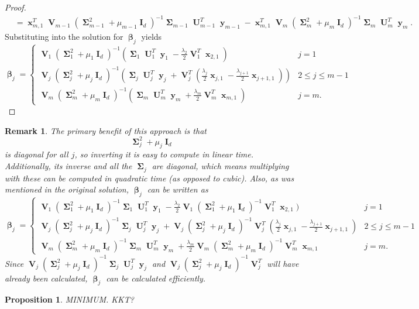 \documentclass[12pt]{article}
\DeclareMathOperator{\bx}{\mathbf{x}}
\DeclareMathOperator{\by}{\mathbf{y}}
\DeclareMathOperator{\bI}{\mathbf{I}}
\DeclareMathOperator{\bU}{\mathbf{U}}
\DeclareMathOperator{\bV}{\mathbf{V}}
\DeclareMathOperator{\bbeta}{\boldsymbol{\beta}}
\DeclareMathOperator{\bSigma}{\mathbf{\Sigma}}
\newtheorem{prop}{Proposition}
\newtheorem*{remark}{Remark}
\begin{document}
\begin{proof}
\begin{align*}
& = \bx_{m,1}^T\bV_{m-1}(\bSigma_{m-1}^2+\mu_{m-1}\bI_d)^{-1}\bSigma_{m-1} \bU_{m-1}^T \by_{m-1}-\bx_{m,1}^T\bV_{m}(\bSigma_{m}^2+\mu_{m}\bI_d)^{-1}\bSigma_m \bU_m^T\by_m.
\end{align*}
Substituting into the solution for $\bbeta_j$ yields
\begin{equation} \label{eqn:beta_svd}
\bbeta_j=\begin{cases}
\bV_1(\bSigma_1^2+\mu_1\bI_d)^{-1}(\bSigma_1 \bU_1^T \by_1 -\frac{\lambda_{2}}{2}\bV_1^T\bx_{2, 1}) & j=1 \\
\bV_j(\bSigma_j^2+\mu_j\bI_d)^{-1}(\bSigma_j \bU_j^T \by_j + \bV_j^T(\frac{\lambda_j}{2}\bx_{j, 1}-\frac{\lambda_{j+1}}{2}\bx_{j+1, 1})) & 2 \leq j \leq m-1 \\
\bV_m(\bSigma_m^2+\mu_m\bI_d)^{-1}(\bSigma_m \bU_m^T \by_m + \frac{\lambda_m}{2}\bV_m^T\bx_{m, 1}) & j=m. \end{cases}
\end{equation}
\end{proof}
\begin{remark}
The primary benefit of this approach is that 
$$\bSigma_j^2+\mu_j\bI_d$$
is diagonal for all $j$, so inverting it is easy to compute in linear time. Additionally, its inverse and all the $\bSigma_j$ are diagonal, which means multiplying with these can be computed in quadratic time (as opposed to cubic). Also, as was mentioned in the original solution, $\bbeta_j$ can be written as 
$$\bbeta_j=\begin{cases}
\bV_1(\bSigma_1^2+\mu_1\bI_d)^{-1}\bSigma_1 \bU_1^T \by_1 -\frac{\lambda_{2}}{2}\bV_1(\bSigma_1^2+\mu_1\bI_d)^{-1}\bV_1^T\bx_{2, 1}) & j=1 \\
\bV_j(\bSigma_j^2+\mu_j\bI_d)^{-1}\bSigma_j \bU_j^T \by_j + \bV_j(\bSigma_j^2+\mu_j\bI_d)^{-1}\bV_j^T(\frac{\lambda_j}{2}\bx_{j, 1}-\frac{\lambda_{j+1}}{2}\bx_{j+1, 1}) & 2 \leq j \leq m-1 \\
\bV_m(\bSigma_m^2+\mu_m\bI_d)^{-1}\bSigma_m \bU_m^T \by_m + \frac{\lambda_m}{2}\bV_m(\bSigma_m^2+\mu_m\bI_d)^{-1}\bV_m^T\bx_{m, 1} & j=m. \end{cases}$$
Since $\bV_j(\bSigma_j^2+\mu_j\bI_d)^{-1}\bSigma_j \bU_j^T \by_j$ and $\bV_j(\bSigma_j^2+\mu_j\bI_d)^{-1}\bV_j^T$ will have already been calculated, $\bbeta_j$ can be calculated efficiently.
\end{remark}

\begin{prop}
MINIMUM. KKT?
\end{prop}
\end{document}
